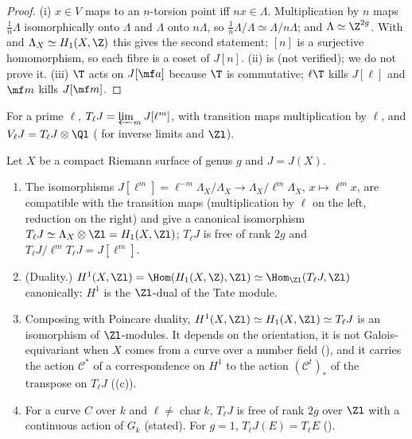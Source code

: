 \begin{proof}
(i) $x\in V$ maps to an $n$-torsion point iff $nx\in\Lambda$. Multiplication by $n$ maps $\frac1n\Lambda$ isomorphically onto $\Lambda$ and $\Lambda$ onto $n\Lambda$, so
$\frac1n\Lambda/\Lambda\simeq\Lambda/n\Lambda$; and $\Lambda\simeq\Z^{2g}$. With  and $\Lambda_X\simeq H_1(X,\Z)$ this gives the second statement; $[n]$ is a surjective homomorphism, so each fibre is a coset of
$J[n]$. (ii) is \cite[Section 8]{MilneAbelian86} (not verified); we do not prove it. (iii) $\T$ acts on $J[\mf a]$ because $\T$ is commutative; $\ell\T$ kills $J[\ell]$ and $\mf m$
kills $J[\mf m]$.
\end{proof}

\begin{definition}\label{def:curves:tate-module}
For a prime $\ell$, $T_\ell J=\varprojlim_mJ[\ell^m]$, with transition maps multiplication by $\ell$, and $V_\ell J=T_\ell J\otimes\Ql$ ( for inverse limits and $\Zl$).
\end{definition}

\begin{proposition}\label{prop:curves:tate-module}
Let $X$ be a compact Riemann surface of genus $g$ and $J=J(X)$.
\begin{enumerate}[label=(\roman*)]
\item The isomorphisms $J[\ell^m]=\ell^{-m}\Lambda_X/\Lambda_X\to\Lambda_X/\ell^m\Lambda_X$, $x\mapsto\ell^mx$, are compatible with the transition maps (multiplication by $\ell$ on the left,
reduction on the right) and give a canonical isomorphism $T_\ell J\simeq\Lambda_X\otimes\Zl=H_1(X,\Zl)$; $T_\ell J$ is free of rank $2g$ and $T_\ell J/\ell^mT_\ell J=J[\ell^m]$.
\item (Duality.) $H^1(X,\Zl)=\Hom(H_1(X,\Z),\Zl)\simeq\Hom_{\Zl}(T_\ell J,\Zl)$ canonically: $H^1$ is the $\Zl$-dual of the Tate module.
\item Composing with Poincare duality, $H^1(X,\Zl)\simeq H_1(X,\Zl)\simeq T_\ell J$ is an isomorphism of $\Zl$-modules. It depends on the orientation, it is not
Galois-equivariant when $X$ comes from a curve over a number field (), and it carries the action $\mathcal C^*$ of a correspondence on $H^1$ to the action
$(\mathcal C^t)_*$ of the transpose on $T_\ell J$ ((c)).
\item For a curve $C$ over $k$ and $\ell\ne\operatorname{char}k$, $T_\ell J$ is free of rank $2g$ over $\Zl$ with a continuous action of $G_k$ (stated). For $g=1$, $T_\ell J(E)=T_\ell E$
().
\end{enumerate}
\end{proposition}

